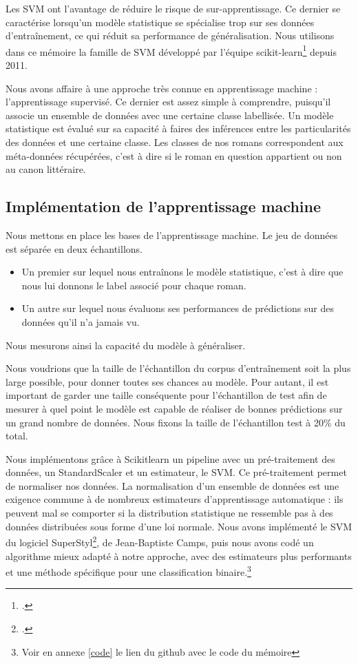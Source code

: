 Les SVM ont l'avantage de réduire le risque de sur-apprentissage. Ce dernier se caractérise lorsqu'un modèle statistique se spécialise trop sur ses données d'entraînement, ce qui réduit sa performance de généralisation. Nous utilisons dans ce mémoire la famille de SVM développé par l'équipe scikit-learn\footcites{scikit-learn_2011} depuis 2011.

Nous avons affaire à une approche très connue en apprentissage machine : l'apprentissage supervisé. Ce dernier est assez simple à comprendre, puisqu'il associe un ensemble de données avec une certaine classe labellisée. Un modèle statistique est évalué sur sa capacité à faires des inférences entre les particularités des données et une certaine classe. Les classes de nos romans correspondent aux méta-données récupérées, c'est à dire si le roman en question appartient ou non au canon littéraire.

\subsection{Implémentation de l'apprentissage machine}

Nous mettons en place les bases de l'apprentissage machine. Le jeu de données est séparée en deux échantillons. 

\begin{itemize}
    \item Un premier sur lequel nous entraînons le modèle statistique, c'est à dire que nous lui donnons le label associé pour chaque roman.
    \item Un autre sur lequel nous évaluons ses performances de prédictions sur des données qu'il n'a jamais vu. 
\end{itemize} 

Nous mesurons ainsi la capacité du modèle à généraliser.

Nous voudrions que la taille de l'échantillon du corpus d'entraînement soit la plus large possible, pour donner toutes ses chances au modèle. Pour autant, il est important de garder une taille conséquente pour l'échantillon de test afin de mesurer à quel point le modèle est capable de réaliser de bonnes prédictions sur un grand nombre de données. Nous fixons la taille de l'échantillon test à 20\% du total. 

Nous implémentons grâce à Scikitlearn un pipeline avec un pré-traitement des données, un StandardScaler et un estimateur, le SVM. Ce pré-traitement permet de normaliser nos données. La normalisation d'un ensemble de données est une exigence commune à de nombreux estimateurs d'apprentissage automatique : ils peuvent mal se comporter si la distribution statistique ne ressemble pas à des données distribuées sous forme d'une loi normale. Nous avons implémenté le SVM du logiciel SuperStyl\footcites{Camps_SUPERvised_STYLometry_SuperStyl_2021}, de Jean-Baptiste Camps, puis nous avons codé un algorithme mieux adapté à notre approche, avec des estimateurs plus performants et une méthode spécifique pour une classification binaire.\footnote{Voir en annexe \ref{code} le lien du github avec le code du mémoire} 

